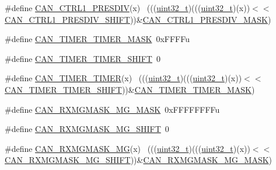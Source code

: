 \begin{DoxyCompactItemize}
\#define \hyperlink{group___c_a_n___register___masks_gae4f2537b17cd4d3cf314a10cec573fbd}{C\+A\+N\+\_\+\+C\+T\+R\+L1\+\_\+\+P\+R\+E\+S\+D\+IV}(x)                                      ~(((\hyperlink{_p_e___types_8h_a33594304e786b158f3fb30289278f5af}{uint32\+\_\+t})(((\hyperlink{_p_e___types_8h_a33594304e786b158f3fb30289278f5af}{uint32\+\_\+t})(x))$<$$<$\hyperlink{group___c_a_n___register___masks_ga762ed1bd89d4db4a6f34a12f8ae0afcf}{C\+A\+N\+\_\+\+C\+T\+R\+L1\+\_\+\+P\+R\+E\+S\+D\+I\+V\+\_\+\+S\+H\+I\+FT}))\&\hyperlink{group___c_a_n___register___masks_gad8d384c87d48a3fc0b1ae52949823818}{C\+A\+N\+\_\+\+C\+T\+R\+L1\+\_\+\+P\+R\+E\+S\+D\+I\+V\+\_\+\+M\+A\+SK})
\item 
\#define \hyperlink{group___c_a_n___register___masks_gaa7323a19c6c05a13fdf8489331e9671f}{C\+A\+N\+\_\+\+T\+I\+M\+E\+R\+\_\+\+T\+I\+M\+E\+R\+\_\+\+M\+A\+SK}~0x\+F\+F\+F\+Fu
\item 
\#define \hyperlink{group___c_a_n___register___masks_gac979f0c3637eddae258cc50c0e9bb9cf}{C\+A\+N\+\_\+\+T\+I\+M\+E\+R\+\_\+\+T\+I\+M\+E\+R\+\_\+\+S\+H\+I\+FT}~0
\item 
\#define \hyperlink{group___c_a_n___register___masks_ga48012976326bd0be5c71b2ce472a19ae}{C\+A\+N\+\_\+\+T\+I\+M\+E\+R\+\_\+\+T\+I\+M\+ER}(x)                                          ~(((\hyperlink{_p_e___types_8h_a33594304e786b158f3fb30289278f5af}{uint32\+\_\+t})(((\hyperlink{_p_e___types_8h_a33594304e786b158f3fb30289278f5af}{uint32\+\_\+t})(x))$<$$<$\hyperlink{group___c_a_n___register___masks_gac979f0c3637eddae258cc50c0e9bb9cf}{C\+A\+N\+\_\+\+T\+I\+M\+E\+R\+\_\+\+T\+I\+M\+E\+R\+\_\+\+S\+H\+I\+FT}))\&\hyperlink{group___c_a_n___register___masks_gaa7323a19c6c05a13fdf8489331e9671f}{C\+A\+N\+\_\+\+T\+I\+M\+E\+R\+\_\+\+T\+I\+M\+E\+R\+\_\+\+M\+A\+SK})
\item 
\#define \hyperlink{group___c_a_n___register___masks_ga2d7a5f68a7047b3c535a554cc113ef4b}{C\+A\+N\+\_\+\+R\+X\+M\+G\+M\+A\+S\+K\+\_\+\+M\+G\+\_\+\+M\+A\+SK}~0x\+F\+F\+F\+F\+F\+F\+F\+Fu
\item 
\#define \hyperlink{group___c_a_n___register___masks_ga1ace67c70d9f25a27ca39ce78cb0034d}{C\+A\+N\+\_\+\+R\+X\+M\+G\+M\+A\+S\+K\+\_\+\+M\+G\+\_\+\+S\+H\+I\+FT}~0
\item 
\#define \hyperlink{group___c_a_n___register___masks_gafff55f047dbc3c1e1bccd43c79897c08}{C\+A\+N\+\_\+\+R\+X\+M\+G\+M\+A\+S\+K\+\_\+\+MG}(x)                                          ~(((\hyperlink{_p_e___types_8h_a33594304e786b158f3fb30289278f5af}{uint32\+\_\+t})(((\hyperlink{_p_e___types_8h_a33594304e786b158f3fb30289278f5af}{uint32\+\_\+t})(x))$<$$<$\hyperlink{group___c_a_n___register___masks_ga1ace67c70d9f25a27ca39ce78cb0034d}{C\+A\+N\+\_\+\+R\+X\+M\+G\+M\+A\+S\+K\+\_\+\+M\+G\+\_\+\+S\+H\+I\+FT}))\&\hyperlink{group___c_a_n___register___masks_ga2d7a5f68a7047b3c535a554cc113ef4b}{C\+A\+N\+\_\+\+R\+X\+M\+G\+M\+A\+S\+K\+\_\+\+M\+G\+\_\+\+M\+A\+SK})
$$
\end{DoxyCompactItemize}
